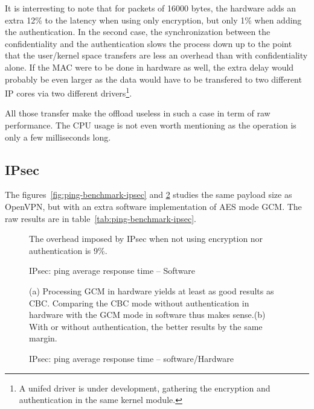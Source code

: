 \noindent It is interresting to note that for packets of 16000 bytes, the hardware adds an extra 12\% to the latency when using only encryption, but only 1\% when adding the authentication.
In the second case, the synchronization between the confidentiality and the authentication slows the process down up to the point that the user/kernel space transfers are less an overhead than with confidentiality alone.
If the MAC were to be done in hardware as well, the extra delay would probably be even larger as the data would have to be transfered to two different IP cores via two different drivers\footnote{A unifed driver is under development, gathering the encryption and authentication in the same kernel module.}.

\noindent All those transfer make the offload useless in such a case in term of raw performance.
The CPU usage is not even worth mentioning as the operation is only a few milliseconds long.



\subsection{IPsec}\label{sec:lantecy-ipsec}
The figures~\ref{fig:ping-benchmark-ipsec} and \ref{fig:ping-benchmark-ipsec-soft-hard}  studies the same payload size as OpenVPN, but with an extra software implementation of AES mode GCM. The raw results are in table~\ref{tab:ping-benchmark-ipsec}.

\begin{figure}[ht]

\caption{IPsec: ping average response time -- Software}{The overhead imposed by IPsec when not using encryption nor authentication is 9\%.}
\label{fig:ping-benchmark-ipsec-soft}
\end{figure}

\begin{figure}[ht]
\center
{}
\caption{IPsec: ping average response time -- software/Hardware}{\newline{}(a) Processing GCM in hardware yields at least as good results as CBC. Comparing the CBC mode without authentication in hardware with the GCM mode in software thus makes sense.\newline{}(b) With or without authentication, the better results by the same margin.}
\label{fig:ping-benchmark-ipsec-soft-hard}
\end{figure}

